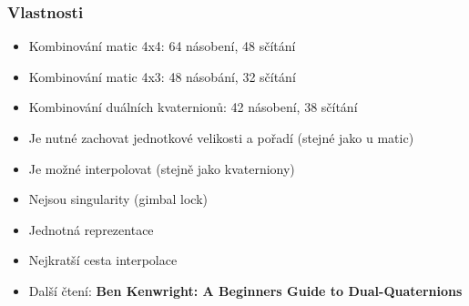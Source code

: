 \begin{frame}
\frametitle{Vlastnosti}
	\begin{itemize}
  \item Kombinování matic 4x4: 64 násobení, 48 sčítání
  \item Kombinování matic 4x3: 48 násobání, 32 sčítání
  \item Kombinování duálních kvaternionů: 42 násobení, 38 sčítání
  \item Je nutné zachovat jednotkové velikosti a pořadí (stejné jako u matic)
  \item Je možné interpolovat (stejně jako kvaterniony)
  \item Nejsou singularity (gimbal lock)
  \item Jednotná reprezentace
  \item Nejkratší cesta interpolace
  \item Další čtení: \textbf{Ben Kenwright: A Beginners Guide to Dual-Quaternions}
	\end{itemize}
\end{frame}

